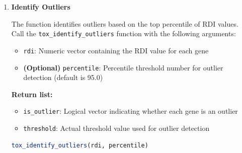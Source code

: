 \documentclass[11pt]{article}
\begin{document}
\begin{enumerate}
\begin{enumerate}
	      	      \textbf{Return list:}
	      	      \begin{itemize}
	      	      	\item \texttt{rdi}: Numeric vector containing the RDI value for each
	      	      	      gene
	      	      	      
	      	      	\item \texttt{sorted\_rdi}: Numeric vector containing the RDI values
	      	      	      sorted in ascending order
	      	      \end{itemize}
	      	      
	      	      \begin{lstlisting}[language=R, caption={R Compute Relative Distance Index (RDI)}]
tox_compute_rdi(distances, gene_to_fam, dscale)
	      	      \end{lstlisting}
	      	      
	      	\item \textbf{Identify Outliers}
	      	      
	      	      The function identifies outliers based on the top percentile of RDI values.
	      	      Call the \texttt{tox\_identify\_outliers} function with the following arguments:
	      	      
	      	      \begin{itemize}
	      	      	\item \texttt{rdi}: Numeric vector containing the RDI value for each
	      	      	      gene
	      	      	      
	      	      	\item \textbf{(Optional)} \texttt{percentile}: Percentile threshold
	      	      	      number for outlier detection (default is 95.0)
	      	      \end{itemize}
	      	      
	      	      \textbf{Return list:}
	      	      \begin{itemize}
	      	      	\item \texttt{is\_outlier}: Logical vector indicating whether each gene
	      	      	      is an outlier
	      	      	      
	      	      	\item \texttt{threshold}: Actual threshold value used for outlier detection
	      	      \end{itemize}
	      	      \begin{lstlisting}[language=R, caption={R Identify Outliers}]
tox_identify_outliers(rdi, percentile)
	      	      \end{lstlisting}
	      \end{enumerate}
	      

\end{enumerate}
\end{document}
